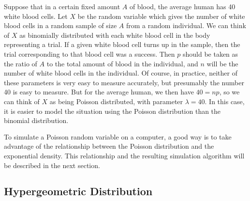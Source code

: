 \begin{example}\label{exam 5.5.5} Suppose that in a certain fixed amount $A$ of blood,
the average human has 40 white blood cells.  Let
$X$ be the random variable which gives the number of white blood cells in a random
sample of size $A$ from a random individual.  We can think of
$X$ as binomially distributed with each white blood cell in the body representing a
trial.  If a given white blood cell turns up in the sample, then the trial
corresponding to that blood cell was a success.  Then $p$ should be taken as the ratio
of $A$ to the total amount of blood in the individual, and $n$ will be the number of
white blood cells in the individual.  Of course, in practice, neither of these
parameters is very easy to measure accurately, but presumably the number 40 is easy to
measure.  But for the average human, we then have $40 = np$, so we can think of $X$ as
being Poisson distributed, with parameter $\lambda = 40$.  In this case, it is easier
to model the situation using the Poisson distribution than the binomial distribution.
\end{example}
\par To simulate a Poisson random variable on a computer, a good way is to take
advantage of the relationship between the Poisson distribution and the exponential
density.  This relationship and the resulting simulation algorithm will be described
in the next section.

\subsection*{Hypergeometric Distribution}

